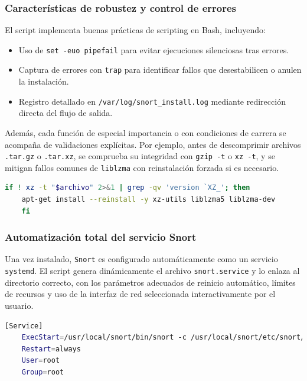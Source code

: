 \documentclass[12pt,a4paper]{report}
\begin{document}
\subsubsection{Características de robustez y control de errores}

El script implementa buenas prácticas de scripting en Bash, incluyendo:

\begin{itemize}
	\item Uso de \texttt{set -euo pipefail} para evitar ejecuciones silenciosas tras errores.
	\item Captura de errores con \texttt{trap} para identificar fallos que desestabilicen o anulen la instalación.
	\item Registro detallado en \texttt{/var/log/snort\_install.log} mediante redirección directa del flujo de salida.
\end{itemize}

Además, cada función de especial importancia o con condiciones de carrera se acompaña de validaciones explícitas. Por ejemplo, antes de descomprimir archivos \texttt{.tar.gz} o \texttt{.tar.xz}, se comprueba su integridad con \texttt{gzip -t} o \texttt{xz -t}, y se mitigan fallos comunes de \texttt{liblzma} con reinstalación forzada si es necesario.

\begin{lstlisting}[language=bash, caption={Validación e instalación segura de paquetes .xz}, label=lst:xz]
	if ! xz -t "$archivo" 2>&1 | grep -qv 'version `XZ_'; then
	apt-get install --reinstall -y xz-utils liblzma5 liblzma-dev
	fi
\end{lstlisting}

\subsubsection{Automatización total del servicio Snort}

Una vez instalado, \texttt{Snort} es configurado automáticamente como un servicio \texttt{systemd}. El script genera dinámicamente el archivo \texttt{snort.service} y lo enlaza al directorio correcto, con los parámetros adecuados de reinicio automático, límites de recursos y uso de la interfaz de red seleccionada interactivamente por el usuario.

\begin{lstlisting}[language=bash, caption={Sección relevante del systemd generado}, label=lst:systemd]
	[Service]
	ExecStart=/usr/local/snort/bin/snort -c /usr/local/snort/etc/snort/snort.lua -i eth0 -A alert_fast
	Restart=always
	User=root
	Group=root
\end{lstlisting}
\end{document}
